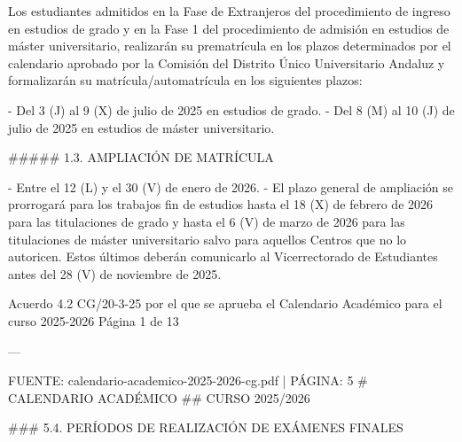 \documentclass{article}
\begin{document}
\begin{itemize}
\begin{itemize}
\begin{scriptsize}
                  Los estudiantes admitidos en la Fase de Extranjeros del procedimiento de ingreso en estudios de grado y en la Fase 1 del procedimiento de admisión en estudios de máster universitario, realizarán su prematrícula en los plazos determinados por el calendario aprobado por la Comisión del Distrito Único Universitario Andaluz y formalizarán su matrícula/automatrícula en los siguientes plazos:

                  - Del 3 (J) al 9 (X) de julio de 2025 en estudios de grado.
                  - Del 8 (M) al 10 (J) de julio de 2025 en estudios de máster universitario.

                  \#\#\#\#\# 1.3. AMPLIACIÓN DE MATRÍCULA

                  - Entre el 12 (L) y el 30 (V) de enero de 2026.
                  - El plazo general de ampliación se prorrogará para los trabajos fin de estudios hasta el 18 (X) de febrero de 2026 para las titulaciones de grado y hasta el 6 (V) de marzo de 2026 para las titulaciones de máster universitario salvo para aquellos Centros que no lo autoricen. Estos últimos deberán comunicarlo al Vicerrectorado de Estudiantes antes del 28 (V) de noviembre de 2025.

                  Acuerdo 4.2 CG/20-3-25 por el que se aprueba el Calendario Académico para el curso 2025-2026  Página 1 de 13

                  ---

                  FUENTE: calendario-academico-2025-2026-cg.pdf | PÁGINA: 5
                  \# CALENDARIO ACADÉMICO
                  \#\# CURSO 2025/2026

                  \#\#\# 5.4. PERÍODOS DE REALIZACIÓN DE EXÁMENES FINALES


\end{scriptsize}
\end{itemize}
\end{itemize}
\end{document}
